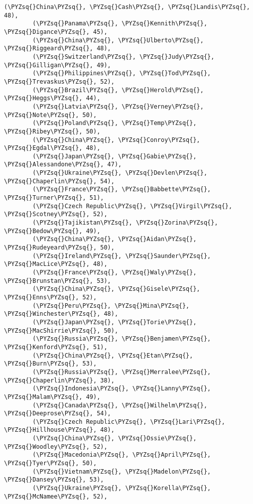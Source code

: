 \documentclass[11pt]{article}
\def\PYZsq{\textquotesingle}%
\def\PYZsq{\char`\'}
\begin{document}
\begin{Verbatim}[commandchars=\\\{\}]
        (\PYZsq{}China\PYZsq{}, \PYZsq{}Cash\PYZsq{}, \PYZsq{}Landis\PYZsq{}, 48),
        (\PYZsq{}Panama\PYZsq{}, \PYZsq{}Kennith\PYZsq{}, \PYZsq{}Digance\PYZsq{}, 45),
        (\PYZsq{}China\PYZsq{}, \PYZsq{}Ulberto\PYZsq{}, \PYZsq{}Riggeard\PYZsq{}, 48),
        (\PYZsq{}Switzerland\PYZsq{}, \PYZsq{}Judy\PYZsq{}, \PYZsq{}Gilligan\PYZsq{}, 49),
        (\PYZsq{}Philippines\PYZsq{}, \PYZsq{}Tod\PYZsq{}, \PYZsq{}Trevaskus\PYZsq{}, 52),
        (\PYZsq{}Brazil\PYZsq{}, \PYZsq{}Herold\PYZsq{}, \PYZsq{}Heggs\PYZsq{}, 44),
        (\PYZsq{}Latvia\PYZsq{}, \PYZsq{}Verney\PYZsq{}, \PYZsq{}Note\PYZsq{}, 50),
        (\PYZsq{}Poland\PYZsq{}, \PYZsq{}Temp\PYZsq{}, \PYZsq{}Ribey\PYZsq{}, 50),
        (\PYZsq{}China\PYZsq{}, \PYZsq{}Conroy\PYZsq{}, \PYZsq{}Egdal\PYZsq{}, 48),
        (\PYZsq{}Japan\PYZsq{}, \PYZsq{}Gabie\PYZsq{}, \PYZsq{}Alessandone\PYZsq{}, 47),
        (\PYZsq{}Ukraine\PYZsq{}, \PYZsq{}Devlen\PYZsq{}, \PYZsq{}Chaperlin\PYZsq{}, 54),
        (\PYZsq{}France\PYZsq{}, \PYZsq{}Babbette\PYZsq{}, \PYZsq{}Turner\PYZsq{}, 51),
        (\PYZsq{}Czech Republic\PYZsq{}, \PYZsq{}Virgil\PYZsq{}, \PYZsq{}Scotney\PYZsq{}, 52),
        (\PYZsq{}Tajikistan\PYZsq{}, \PYZsq{}Zorina\PYZsq{}, \PYZsq{}Bedow\PYZsq{}, 49),
        (\PYZsq{}China\PYZsq{}, \PYZsq{}Aidan\PYZsq{}, \PYZsq{}Rudeyeard\PYZsq{}, 50),
        (\PYZsq{}Ireland\PYZsq{}, \PYZsq{}Saunder\PYZsq{}, \PYZsq{}MacLice\PYZsq{}, 48),
        (\PYZsq{}France\PYZsq{}, \PYZsq{}Waly\PYZsq{}, \PYZsq{}Brunstan\PYZsq{}, 53),
        (\PYZsq{}China\PYZsq{}, \PYZsq{}Gisele\PYZsq{}, \PYZsq{}Enns\PYZsq{}, 52),
        (\PYZsq{}Peru\PYZsq{}, \PYZsq{}Mina\PYZsq{}, \PYZsq{}Winchester\PYZsq{}, 48),
        (\PYZsq{}Japan\PYZsq{}, \PYZsq{}Torie\PYZsq{}, \PYZsq{}MacShirrie\PYZsq{}, 50),
        (\PYZsq{}Russia\PYZsq{}, \PYZsq{}Benjamen\PYZsq{}, \PYZsq{}Kenford\PYZsq{}, 51),
        (\PYZsq{}China\PYZsq{}, \PYZsq{}Etan\PYZsq{}, \PYZsq{}Burn\PYZsq{}, 53),
        (\PYZsq{}Russia\PYZsq{}, \PYZsq{}Merralee\PYZsq{}, \PYZsq{}Chaperlin\PYZsq{}, 38),
        (\PYZsq{}Indonesia\PYZsq{}, \PYZsq{}Lanny\PYZsq{}, \PYZsq{}Malam\PYZsq{}, 49),
        (\PYZsq{}Canada\PYZsq{}, \PYZsq{}Wilhelm\PYZsq{}, \PYZsq{}Deeprose\PYZsq{}, 54),
        (\PYZsq{}Czech Republic\PYZsq{}, \PYZsq{}Lari\PYZsq{}, \PYZsq{}Hillhouse\PYZsq{}, 48),
        (\PYZsq{}China\PYZsq{}, \PYZsq{}Ossie\PYZsq{}, \PYZsq{}Woodley\PYZsq{}, 52),
        (\PYZsq{}Macedonia\PYZsq{}, \PYZsq{}April\PYZsq{}, \PYZsq{}Tyer\PYZsq{}, 50),
        (\PYZsq{}Vietnam\PYZsq{}, \PYZsq{}Madelon\PYZsq{}, \PYZsq{}Dansey\PYZsq{}, 53),
        (\PYZsq{}Ukraine\PYZsq{}, \PYZsq{}Korella\PYZsq{}, \PYZsq{}McNamee\PYZsq{}, 52),

\end{Verbatim}
\end{document}

